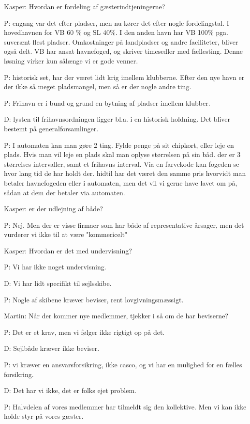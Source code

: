 Kasper: Hvordan er fordeling af gæsterindtjeningerne?

P: engang var det efter pladser, men nu kører det efter nogle fordelingstal. I hovedhavnen for VB 60 \% og SL 40\%. I den anden havn har VB 100\% pga. suverænt flest pladser. Omkostninger på landpladser og andre faciliteter, bliver også delt. VB har ansat havnefoged, og skriver timesedler med fællesting. Denne løsning virker kun sålænge vi er gode venner.


P: historisk set, har der været lidt krig imellem klubberne. Efter den nye havn er der ikke så meget pladsmangel, men så er der nogle andre ting.


P: Frihavn er i bund og grund en bytning af pladser imellem klubber.


D: lysten til frihavnsordningen ligger bl.a. i en historisk holdning. Det bliver bestemt på generalforsamlinger.


P: I automaten kan man gøre 2 ting. Fylde penge på sit chipkort, eller leje en plads. Hvis man vil leje en plads skal man oplyse størrelsen på sin båd. der er 3 størrelses intervaller, samt et frihavns interval. Via en farvekode kan fogeden se hvor lang tid de har holdt der. hidtil har det været den samme pris hvorvidt man betaler havnefogeden eller i automaten, men det vil vi gerne have lavet om på, sådan at dem der betaler via automaten.


Kasper: er der udlejning af både?

P: Nej. Men der er visse firmaer som har både af representative årsager, men det vurderer vi ikke til at være "kommericelt"


Kasper: Hvordan er det med undervisning?

P: Vi har ikke noget undervisning.

D: Vi har lidt specifikt til sejlsskibe.

P: Nogle af skibene kræver beviser, rent lovgivningsmæssigt. 

Martin: Når der kommer nye medlemmer, tjekker i så om de har beviserne?

P: Det er et krav, men vi følger ikke rigtigt op på det.

D: Sejlbåde kræver ikke beviser.

P: vi kræver en ansvarsforsikring, ikke casco, og vi har en mulighed for en fælles forsikring.

D: Det har vi ikke, det er folks ejet problem.

P: Halvdelen af vores medlemmer har tilmeldt sig den kollektive. Men vi kan ikke holde styr på vores gæster.


